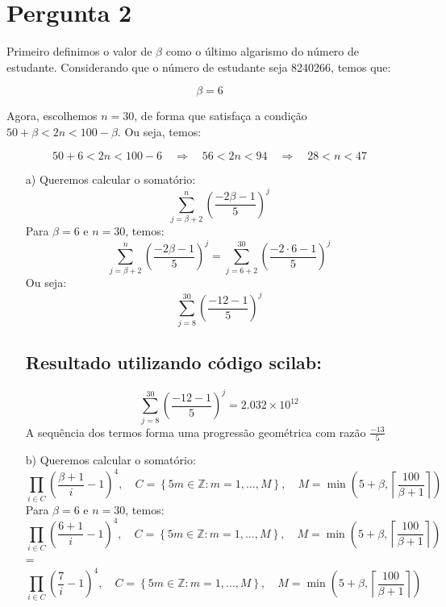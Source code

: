 \chapter{Pergunta 2}

Primeiro definimos o valor de $\beta$ como o último algarismo do número de estudante. Considerando que o número de estudante seja 8240266, temos que:

\[
\beta = 6
\]

Agora, escolhemos $n = 30$, de forma que satisfaça a condição $50 + \beta < 2n < 100 - \beta$. Ou seja, temos:

\[
50 + 6 < 2n < 100 - 6 \quad \Rightarrow \quad 56 < 2n < 94 \quad \Rightarrow \quad 28 < n < 47
\]



\begin{enumerate}


    \item[a)]
    Queremos calcular o somatório:
    \[
    \sum_{j=\beta+2}^{n} \left( \frac{-2\beta-1}{5} \right)^j
    \]
    Para \(\beta = 6\) e \(n = 30\), temos:
    \[
    \sum_{j= \beta+2}^{n} \left( \frac{-2\beta-1}{5} \right)^j = \sum_{j= 6+2}^{30} \left( \frac{-2 \cdot 6 - 1}{5} \right)^j
    \]
    Ou seja:
    \[
    \sum_{j= 8}^{30} \left( \frac{-12 - 1}{5} \right)^j
    \]


\section*{Resultado utilizando  código scilab:}
     \[
    \sum_{j= 8}^{30} \left( \frac{-12 - 1}{5} \right)^j = 2.032 \times 10^{12}
    \]
A sequência dos termos forma uma progressão geométrica com razão $\frac{-13}{5}$


   \item[b)]
   Queremos calcular o somatório:
   \[
\prod_{i \in C} \left( \frac{\beta + 1}{i } -1\right)^4, \quad C = \left\{ 5m \in \mathbb{Z}: m = 1, \dots, M \right\}, \quad M = \min \left( 5 + \beta, \left\lceil \frac{100}{\beta + 1} \right\rceil \right)
\]
    Para \(\beta = 6\) e \(n = 30\), temos:
     \[
\prod_{i \in C} \left( \frac{6 + 1}{i } -1\right)^4, \quad C = \left\{ 5m \in \mathbb{Z}: m = 1, \dots, M \right\}, \quad M = \min \left( 5 + \beta, \left\lceil \frac{100}{\beta + 1} \right\rceil \right) 
\]
 = \[
\prod_{i \in C} \left( \frac{7}{i }-1 \right)^4, \quad C = \left\{ 5m \in \mathbb{Z}: m = 1, \dots, M \right\}, \quad M = \min \left( 5 + \beta, \left\lceil \frac{100}{\beta + 1} \right\rceil \right) 
\]


\end{enumerate}
